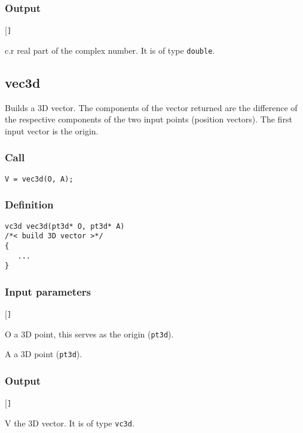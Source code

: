 \subsubsection*{Output}
\begin{desclist}{\tt }{\quad}[\tt ]
   \setlength\itemsep{0pt}
   \item[c.r] real part of the complex number. It is of type \texttt{double}.
\end{desclist}



\subsection{{vec3d}}
Builds a 3D vector. The components of the vector returned are the difference of the respective components of the two input points (position vectors). The first input vector is the origin.

\subsubsection*{Call}
\begin{verbatim}V = vec3d(O, A);\end{verbatim}

\subsubsection*{Definition}
\begin{verbatim}
vc3d vec3d(pt3d* O, pt3d* A)
/*< build 3D vector >*/
{
   ...
}
\end{verbatim}

\subsubsection*{Input parameters}
\begin{desclist}{\tt }{\quad}[\tt ]
   \setlength\itemsep{0pt}
   \item[O] a 3D point, this serves as the origin (\texttt{pt3d}). 
   \item[A] a 3D point (\texttt{pt3d}).     
\end{desclist}

\subsubsection*{Output}
\begin{desclist}{\tt }{\quad}[\tt ]
   \setlength\itemsep{0pt}
   \item[V] the 3D vector. It is of type \texttt{vc3d}.
\end{desclist}



